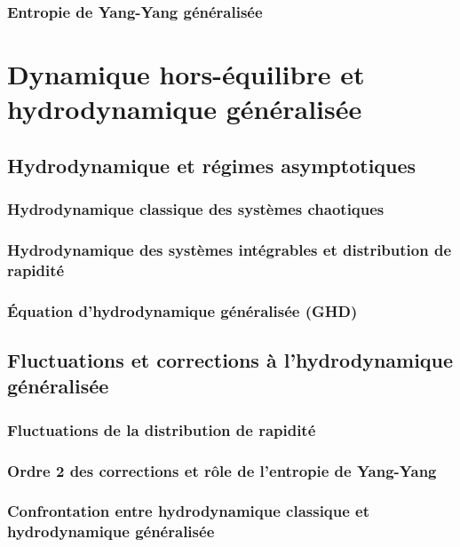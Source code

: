 \section{Entropie de Yang-Yang généralisée}

\part{Dynamique hors-équilibre et hydrodynamique généralisée}

\chapter{Hydrodynamique et régimes asymptotiques}
\minitoc
\section{Hydrodynamique classique des systèmes chaotiques}
\section{Hydrodynamique des systèmes intégrables et distribution de rapidité}
\section{Équation d’hydrodynamique généralisée (GHD)}

\chapter{Fluctuations et corrections à l’hydrodynamique généralisée}
\minitoc
\section{Fluctuations de la distribution de rapidité}

\section{Ordre 2 des corrections et rôle de l’entropie de Yang-Yang}
\section{Confrontation entre hydrodynamique classique et hydrodynamique généralisée}

			            
